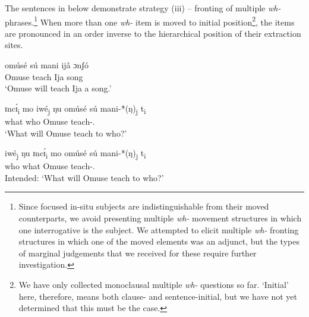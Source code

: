 \documentclass[output=paper,colorlinks,citecolor=brown
]{langscibook}
\begin{document}
The sentences in  below demonstrate strategy (iii) – fronting of multiple \textit{wh-} phrases.\footnote{Since focused in-situ subjects are indistinguishable from their moved counterparts, we avoid presenting multiple \textit{wh-} movement structures in which one interrogative is the subject. We attempted to elicit multiple \textit{wh-} fronting structures in which one of the moved elements was an adjunct, but the types of marginal judgements that we received for these require further investigation.} When more than one \textit{wh-} item is moved to initial position\footnote{We have only collected monoclausal multiple \textit{wh-} questions so far. `Initial' here, therefore, means both clause- and sentence-initial, but we have not yet determined that this must be the case.}, the items are pronounced in an order inverse to the hierarchical position of their extraction sites. 

\ea \label{ex:matte:22}
\begin{xlist}

\ex \label{ex:matte:22a}
\gll omúsé sú mani ijâ ɔnʃó\\
Omuse \Fut{} teach Ija song\\
\glt `Omuse will teach Ija a song.'

\ex \label{ex:matte:22b}
\gll ɪncɪ́\textsubscript{i} mo iwé\textsubscript{j} ŋu omúsé sú mani-*(ŋ)\textsubscript{j} t\textsubscript{i}\\
what \Foc{} who \Foc{} Omuse \Fut{} teach-\Tsg{}.\Acc{} {}\\
\glt `What will Omuse teach to who?'

\ex \label{ex:matte:22c}
\gll * iwé\textsubscript{j} ŋu ɪncɪ́\textsubscript{i} mo omúsé sú mani-*(ŋ)\textsubscript{j} t\textsubscript{i}\\
{} who \Foc{} what \Foc{} Omuse \Fut{} teach-\Tsg{}.\Acc{} {}\\
\glt Intended: `What will Omuse teach to who?'

\end{xlist}
\z
\end{document}

